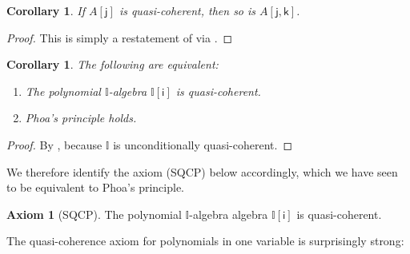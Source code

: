 \documentclass[a4paper,12pt]{amsart}
\newtheorem{lemma}[theorem]{Lemma}
\newtheorem{corollary}[theorem]{Corollary}
\theoremstyle{definition}
\newtheorem*{axiom}{Axiom}
\newcommand{\mbb}[1]{\mathbb{#1}}
\newcommand{\I}{\mbb I}
\newcommand{\ms}[1]{\mathsf{#1}}
\begin{document}
\begin{corollary}\label{cor:Ax-qc-to-Axy-qc}
  If $A[\ms{j}]$ is quasi-coherent, then so is $A[\ms{j},\ms{k}]$.
\end{corollary}
\begin{proof}
  This is simply a restatement of  via .
\end{proof}

\begin{corollary}
  The following are equivalent:
  \begin{enumerate}
    \item The polynomial $\I$-algebra $\I[\ms{i}]$ is quasi-coherent.
    \item Phoa's principle holds.
  \end{enumerate}
\end{corollary}

\begin{proof}
  By , because $\I$ is unconditionally quasi-coherent.
\end{proof}


We therefore identify the axiom (SQCP) below accordingly, which we have seen to be equivalent to Phoa's principle.

\begin{axiom}[SQCP]
  The polynomial $\I$-algebra algebra $\I[\ms{i}]$ is quasi-coherent.
\end{axiom}


The quasi-coherence axiom for polynomials in one variable is surprisingly strong:


\end{document}
